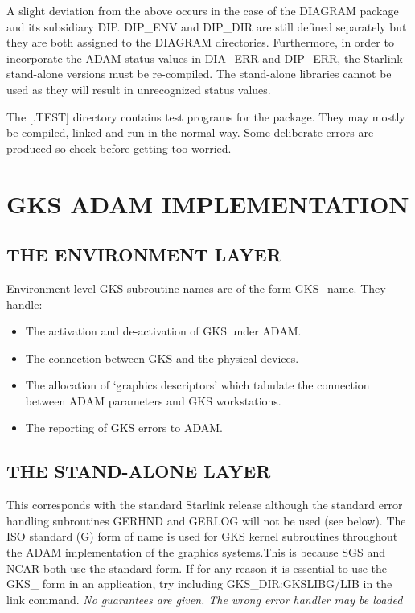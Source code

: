 A slight deviation from the above occurs in the case of the DIAGRAM package
and its subsidiary DIP.
DIP\_ENV and DIP\_DIR are still defined separately
but they are both assigned to the DIAGRAM directories. Furthermore, in order
to incorporate the ADAM status values in DIA\_ERR and DIP\_ERR, the Starlink
stand-alone versions must
be re-compiled. The stand-alone libraries cannot be used as they will result
in unrecognized status values.

The [.TEST] directory contains test programs for the package.
They may mostly be compiled, linked and run in the normal way.
Some deliberate errors are produced so check before getting too worried.

\section{GKS ADAM IMPLEMENTATION}

\subsection{THE ENVIRONMENT LAYER}
 Environment level GKS subroutine names are of the
form GKS\_name. They handle:
\begin{itemize}
\item The activation and de-activation of GKS under ADAM.
\item The connection between GKS and the physical devices.
\item The allocation of `graphics descriptors' which tabulate the connection
between ADAM parameters and GKS workstations.
\item The reporting of GKS errors to ADAM.
\end{itemize}

\subsection{THE STAND-ALONE LAYER}
This corresponds with the standard Starlink release although the standard
error handling subroutines GERHND and GERLOG will not be used (see below).
The ISO standard (G) form of name is used for GKS kernel subroutines throughout
the ADAM implementation
of the graphics systems.This is because SGS and NCAR both use the standard form.
If for any reason it is
essential to use the GKS\_ form in an application, try including
GKS\_DIR:GKSLIBG/LIB in the link command.
{\em No guarantees are given. The wrong error handler may be loaded}

